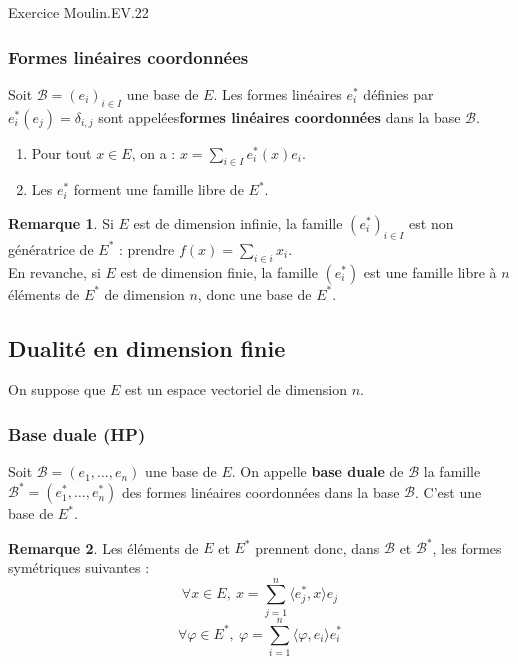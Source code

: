 \documentclass[french]{article}
\newcommand{\st}{^*}
\theoremstyle{plain}
\theoremstyle{definition}
\newtheorem*{rmq}{Remarque}
\theoremstyle{remark}
\begin{document}
Exercice Moulin.EV.22

\subsubsection*{Formes linéaires coordonnées}

\begin{dfn}
	Soit $\mathcal{B}=(e_i)_{i\in I}$ une base de $E$. Les formes linéaires $e_i\st$ définies par $e_i\st(e_j)=\delta_{i,j}$ sont appelées\textbf{formes linéaires coordonnées} dans la base $\mathcal{B}$.
\end{dfn}

\begin{prop}%
	\begin{enumerate}
		\item Pour tout $x\in E$, on a : $x=\displaystyle\sum_{i\in I}e_i\st(x)e_i$.
		\item Les $e_i\st$ forment une famille libre de $E\st$.
	\end{enumerate}
\end{prop}

\begin{rmq}
	Si $E$ est de dimension infinie, la famille $(e_i\st)_{i\in I}$ est non génératrice de $E\st$ : prendre $f(x)=\sum_{i\in i}x_i$. \\
	En revanche, si $E$ est de dimension finie, la famille $(e_i\st)$ est une famille libre à $n$ éléments de $E\st$ de dimension $n$, donc une base de $E\st$.
\end{rmq}

\subsection{Dualité en dimension finie}

On suppose que $E$ est un espace vectoriel de dimension $n$.

\subsubsection*{Base duale (HP)}

\begin{dfn}
	Soit $\mathcal{B}=(e_1,\ldots,e_n)$ une base de $E$. On appelle \textbf{base duale} de $\mathcal{B}$ la famille $\mathcal{B}\st=(e_1\st,\ldots,e_n\st)$ des formes linéaires coordonnées dans la base $\mathcal{B}$. C'est une base de $E\st$. 
\end{dfn}

\begin{rmq}
	Les éléments de $E$ et $E\st$ prennent donc, dans $\mathcal{B}$ et $\mathcal{B}\st$, les formes symétriques suivantes : $$\forall x\in E,\ x=\sum_{j=1}^{n}\langle e_j\st,x\rangle e_j$$ $$\forall \varphi\in E\st,\ \varphi=\sum_{i=1}^{n}\langle\varphi,e_i\rangle e_i\st$$
\end{rmq}
\end{document}
